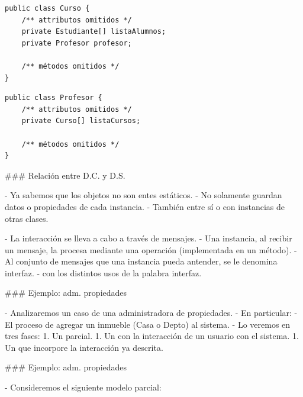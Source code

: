 

\begin{lstlisting}
public class Curso {
    /** attributos omitidos */
    private Estudiante[] listaAlumnos;
    private Profesor profesor;

    /** métodos omitidos */
}
\end{lstlisting}



\begin{lstlisting}
public class Profesor {
    /** attributos omitidos */
    private Curso[] listaCursos;

    /** métodos omitidos */
}
\end{lstlisting}
\columnsend

### Relación entre D.C. y D.S.


- Ya sabemos que los objetos no son entes estáticos.
    - No solamente guardan datos o propiedades de cada instancia.
    - También  entre sí o con instancias de otras clases.

- La interacción se lleva a cabo a través de \alert{mensajes}.
    - Una instancia, al recibir un mensaje, la procesa mediante una operación (implementada en
    un método).
    - Al conjunto de mensajes que una instancia pueda antender, se le denomina \alert{interfaz}.
        -  con los distintos usos de la palabra interfaz.


### Ejemplo: adm. propiedades


- Analizaremos un caso de una administradora de propiedades.
- En particular:
    - El proceso de agregar un inmueble (Casa o Depto) al sistema.
- Lo veremos en tres fases:
    1. Un  parcial.
    1. Un  con la interacción de un usuario con el sistema.
    1. Un  que incorpore la interacción ya descrita.

### Ejemplo: adm. propiedades


- Consideremos el siguiente modelo parcial:

\tikzinlinec[0.55]{%
    \exAdmProps
}

